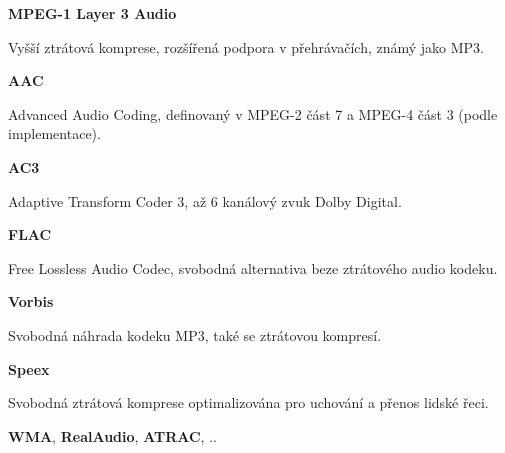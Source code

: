 \vspace{10pt}

\textbf{MPEG-1 Layer 3 Audio}

Vyšší ztrátová komprese, rozšířená podpora v přehrávačích, známý jako MP3.

\vspace{10pt}

\textbf{AAC}

Advanced Audio Coding, definovaný v MPEG-2 část 7 a MPEG-4 část 3 (podle implementace).

\vspace{10pt}

\textbf{AC3}

Adaptive Transform Coder 3, až 6 kanálový zvuk Dolby Digital.

\vspace{10pt}

\textbf{FLAC}

Free Lossless Audio Codec, svobodná alternativa beze ztrátového audio kodeku.

\vspace{10pt}

\textbf{Vorbis}

Svobodná náhrada kodeku MP3, také se ztrátovou kompresí.

\vspace{10pt}

\textbf{Speex}

Svobodná ztrátová komprese optimalizována pro uchování a přenos lidské řeci.

\vspace{10pt}

\textbf{WMA}, \textbf{RealAudio}, \textbf{ATRAC}, ..

